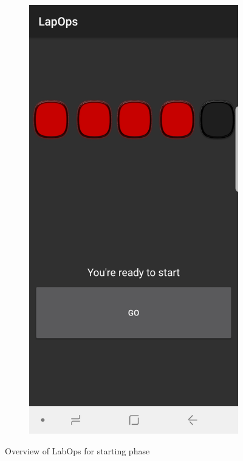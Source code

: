 \begin{figure}[H]
\begin{subfigure}[c]{0.4\textwidth}
	\end{subfigure}
	\hfill
	\begin{subfigure}[c]{0.4\textwidth}
		\includegraphics[width=\textwidth]{Pictures/App/FieldActivated.jpg}
		
	\end{subfigure}
	\caption{Overview of LabOps for starting phase}
	\label{LabOpsnearfield}
\end{figure}


